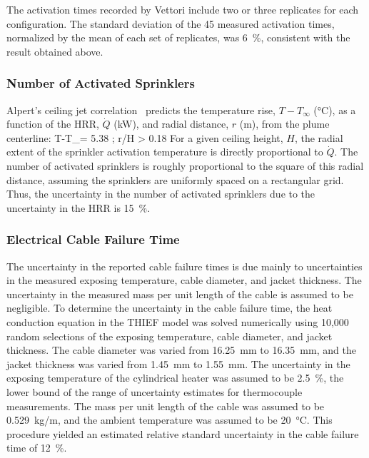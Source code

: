 The activation times recorded by Vettori include two or three replicates for each configuration. The standard deviation of the 45 measured activation times, normalized by the mean of each set of replicates, was 6~\%, consistent with the result obtained above.

\subsubsection{Number of Activated Sprinklers}

Alpert's ceiling jet correlation~\cite{SFPE:Alpert} predicts the temperature rise, $T-T_\infty$ (\unit{\degreeCelsius}), as a function of the HRR, $\dot{Q}$ (kW), and radial distance, $r$ (m), from the plume centerline:
\be
   T-T_\infty = 5.38 \;  \quad ; \quad r/H > 0.18
\ee
For a given ceiling height, $H$, the radial extent of the sprinkler activation temperature is directly proportional to $\dot{Q}$. The number of activated sprinklers is roughly proportional to the square of this radial distance, assuming the sprinklers are uniformly spaced on a rectangular grid. Thus, the uncertainty in the number of activated sprinklers due to the uncertainty in the HRR is 15~\%.


\subsubsection{Electrical Cable Failure Time}

The uncertainty in the reported cable failure times is due mainly to uncertainties in the measured exposing temperature, cable diameter, and jacket thickness. The uncertainty in the measured mass per unit length of the cable is assumed to be negligible. To determine the uncertainty in the cable failure time, the heat conduction equation in the THIEF model was solved numerically using 10,000 random selections of the exposing temperature, cable diameter, and jacket thickness. The cable diameter was varied from 16.25~mm to 16.35~mm, and the jacket thickness was varied from 1.45~mm to 1.55~mm. The uncertainty in the exposing temperature of the cylindrical heater was assumed to be 2.5~\%, the lower bound of the range of uncertainty estimates for thermocouple measurements. The mass per unit length of the cable was assumed to be 0.529~kg/m, and the ambient temperature was assumed to be 20~\unit{\degreeCelsius}. This procedure yielded an estimated relative standard uncertainty in the cable failure time of 12~\%.

